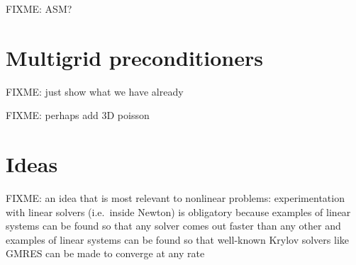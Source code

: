 FIXME: ASM?

\section{Multigrid preconditioners}

FIXME: just show what we have already

FIXME: perhaps add 3D poisson

\section{Ideas}

FIXME: an idea that is most relevant to nonlinear problems: experimentation with linear solvers (i.e.~inside Newton) is obligatory because examples of linear systems can be found so that any solver comes out faster than any other \citep{Nachtigaletal1992} and examples of linear systems can be found so that well-known Krylov solvers like GMRES can be made to converge at any rate \citep{Greenbaumetal1996}

